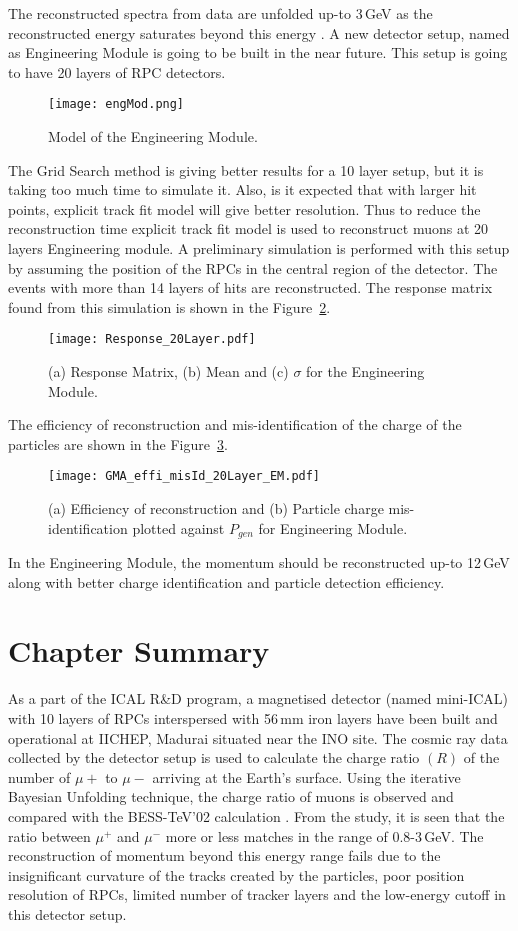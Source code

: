 The reconstructed spectra from data are unfolded up-to 3\,GeV as the
reconstructed energy saturates beyond this energy \cite{daeratio,ratio1}.
A new detector setup, named as Engineering Module is going to be
built in the near future. This setup is going to have 20 layers of RPC
detectors.
\begin{figure}[h]
  \centering
  \texttt{[image: engMod.png]}
  \caption{Model of the Engineering Module.}
  \label{fig:eng_mod}
\end{figure}
The Grid Search method is giving better results for a 10 layer setup,
but it is taking too much time to simulate it. Also, is it expected
that with larger hit points, explicit track fit model will give better
resolution. Thus to reduce the reconstruction time explicit track fit
model is used to reconstruct muons at 20 layers Engineering module.
A preliminary simulation is performed with this setup by assuming the
position of the RPCs in the central region of the detector. The events
with more than 14 layers of hits are reconstructed.
The response matrix found from this simulation is shown in the
Figure~\ref{fig:eng_mod}.
\begin{figure}[h]
  \centering
  \texttt{[image: Response\_20Layer.pdf]}
  \caption{(a) Response Matrix, (b) Mean and (c) $\sigma$ for
    the Engineering Module.}
  \label{fig:eng_mod}
\end{figure}
The efficiency of reconstruction and mis-identification of the charge
of the particles are shown in the Figure~\ref{fig:eng_mod_effi}.
\begin{figure}[h]
  \centering
  \texttt{[image: GMA\_effi\_misId\_20Layer\_EM.pdf]}
  \caption{(a) Efficiency of reconstruction and (b) Particle charge
    mis-identification plotted against $P_{gen}$ for Engineering Module.}
  \label{fig:eng_mod_effi}
\end{figure}
In the Engineering Module, the momentum should be reconstructed
up-to 12\,GeV along with better charge identification and particle
detection efficiency.

\section{Chapter Summary}
As a part of the ICAL R\&D program, a magnetised detector
(named mini-ICAL) with 10 layers of RPCs interspersed with 56\,mm iron
layers have been built and operational at IICHEP, Madurai situated
near the INO site. The cosmic ray data collected by the detector
setup is used to calculate the charge ratio $(R)$ of the number
of $\mu+$ to $\mu-$ arriving at the Earth's surface.
Using the iterative Bayesian Unfolding technique, the charge ratio
of muons is observed and compared with the BESS-TeV'02 calculation
\cite{bess2002}.
From the study, it is seen that the ratio between $\mu^{+}$ and
$\mu^{-}$ more or less matches in the range of 0.8-3\,GeV.
The reconstruction of momentum beyond this energy range fails due to the
insignificant curvature of the tracks created by the particles, poor
position resolution of RPCs, limited number of tracker layers and
the low-energy cutoff in this detector setup.

